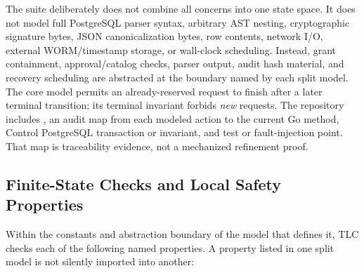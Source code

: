 \documentclass[10pt,journal,compsoc]{IEEEtran}
\newcommand{\code}[1]{\texttt{\detokenize{#1}}}
\begin{document}
The suite deliberately does not combine all concerns into one state space.  It
does not model full PostgreSQL parser syntax, arbitrary AST nesting,
cryptographic signature bytes, JSON canonicalization bytes, row contents,
network I/O, external WORM/timestamp storage, or wall-clock scheduling.
Instead, grant containment, approval/catalog checks, parser output, audit hash
material, and recovery scheduling are abstracted at the boundary named by each
split model.  The core model permits an already-reserved request to finish
after a later terminal transition; its terminal invariant forbids \emph{new}
requests.  The repository includes \code{formal/REFINEMENT.md}, an audit map
from each modeled action to the current Go method, Control PostgreSQL
transaction or invariant, and test or fault-injection point.  That map is
traceability evidence, not a mechanized refinement proof.

\subsection{Finite-State Checks and Local Safety Properties}

Within the constants and abstraction boundary of the model that defines it, TLC
checks each of the following named properties.  A property listed in one split
model is not silently imported into another:
\end{document}
